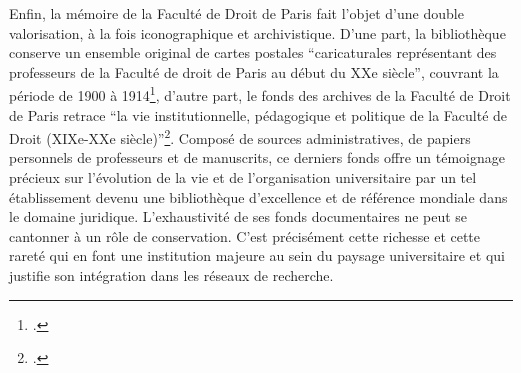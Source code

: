 Enfin, la mémoire de la Faculté de Droit de Paris fait l'objet d'une double valorisation, à la fois iconographique et archivistique. D'une part, la bibliothèque conserve un ensemble original de cartes postales \enquote{caricaturales représentant des professeurs de la Faculté de droit de Paris au début du XXe siècle}, couvrant la période de 1900 à 1914\footcite{BibliothequeInteruniversitaireCujas}, d'autre part, le fonds des archives de la Faculté de Droit de Paris retrace \enquote{la vie institutionnelle, pédagogique et politique de la Faculté de Droit (XIXe-XXe siècle)}\footcite{BibliothequeInteruniversitaireCujas}. Composé de sources administratives, de papiers personnels de professeurs et de manuscrits, ce derniers fonds offre un témoignage précieux sur l'évolution de la vie et de l'organisation universitaire par un tel établissement devenu une bibliothèque d'excellence et de référence mondiale dans le domaine juridique. L'exhaustivité de ses fonds documentaires ne peut se cantonner à un rôle de conservation. C'est précisément cette richesse et cette rareté qui en font une institution majeure au sein du paysage universitaire et qui justifie son intégration dans les réseaux de recherche.